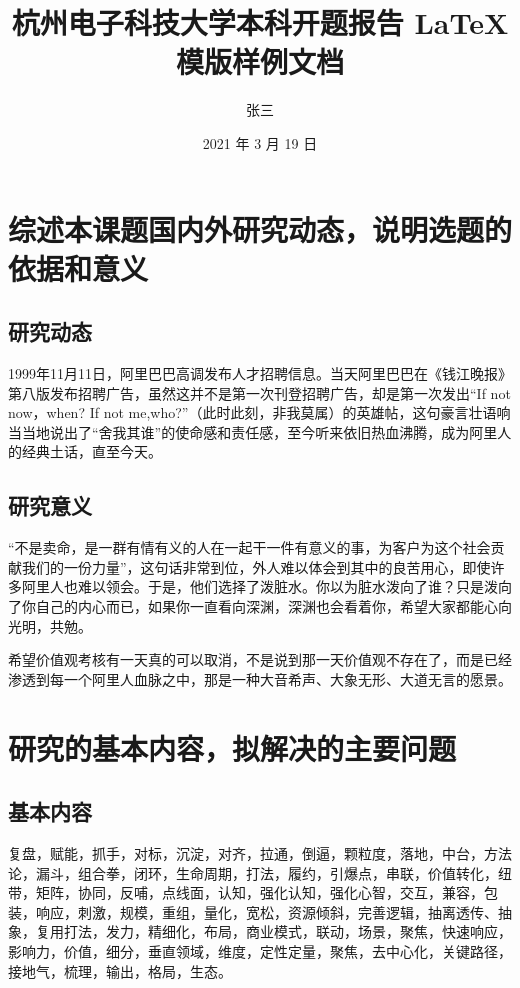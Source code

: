 \documentclass{HDU-Bachelor-Thesis-Proposal}
\title{杭州电子科技大学本科开题报告 \LaTeX{} 模版样例文档}
\author{张三}
\date{2021 年 3 月 19 日}
\begin{document}
\pagestyle{empty}

\maketitle
%

\clearpage

\section{综述本课题国内外研究动态，说明选题的依据和意义}

\subsection{研究动态}

1999年11月11日，阿里巴巴高调发布人才招聘信息。当天阿里巴巴在《钱江晚报》第八版发布招聘广告，虽然这并不是第一次刊登招聘广告，却是第一次发出“If not now，when? If not me,who?”（此时此刻，非我莫属）的英雄帖，这句豪言壮语响当当地说出了“舍我其谁”的使命感和责任感，至今听来依旧热血沸腾，成为阿里人的经典土话\cite{ali-quotes}，直至今天。

\subsection{研究意义}

“不是卖命，是一群有情有义的人在一起干一件有意义的事，为客户为这个社会贡献我们的一份力量”，这句话非常到位，外人难以体会到其中的良苦用心，即使许多阿里人也难以领会。于是，他们选择了泼脏水。你以为脏水泼向了谁？只是泼向了你自己的内心而已，如果你一直看向深渊，深渊也会看着你，希望大家都能心向光明，共勉。

希望价值观考核有一天真的可以取消，不是说到那一天价值观不存在了，而是已经渗透到每一个阿里人血脉之中，那是一种大音希声、大象无形、大道无言的愿景。

\section{研究的基本内容，拟解决的主要问题}

\subsection{基本内容}

复盘，赋能，抓手，对标，沉淀，对齐，拉通，倒逼，颗粒度，落地，中台，方法论，漏斗，组合拳，闭环，生命周期，打法，履约，引爆点，串联，价值转化，纽带，矩阵，协同，反哺，点线面，认知，强化认知，强化心智，交互，兼容，包装，响应，刺激，规模，重组，量化，宽松，资源倾斜，完善逻辑，抽离透传、抽象，复用打法，发力，精细化，布局，商业模式，联动，场景，聚焦，快速响应，影响力，价值，细分，垂直领域，维度，定性定量，聚焦，去中心化，关键路径，接地气，梳理，输出，格局，生态。
\end{document}
